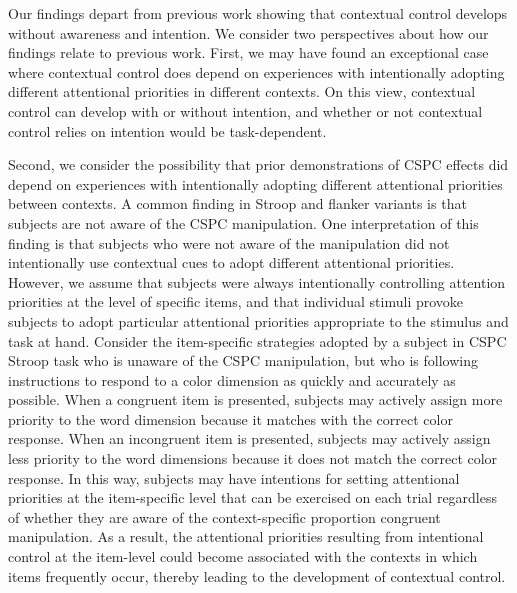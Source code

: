 \documentclass[]{DissertateCUNY}
\begin{document}
Our findings depart from previous work showing that contextual control
develops without awareness and intention. We consider two perspectives
about how our findings relate to previous work. First, we may have found
an exceptional case where contextual control does depend on experiences
with intentionally adopting different attentional priorities in
different contexts. On this view, contextual control can develop with or
without intention, and whether or not contextual control relies on
intention would be task-dependent.

Second, we consider the possibility that prior demonstrations of CSPC
effects did depend on experiences with intentionally adopting different
attentional priorities between contexts. A common finding in Stroop and
flanker variants is that subjects are not aware of the CSPC
manipulation. One interpretation of this finding is that subjects who
were not aware of the manipulation did not intentionally use contextual
cues to adopt different attentional priorities. However, we assume that
subjects were always intentionally controlling attention priorities at
the level of specific items, and that individual stimuli provoke
subjects to adopt particular attentional priorities appropriate to the
stimulus and task at hand. Consider the item-specific strategies adopted
by a subject in CSPC Stroop task who is unaware of the CSPC
manipulation, but who is following instructions to respond to a color
dimension as quickly and accurately as possible. When a congruent item
is presented, subjects may actively assign more priority to the word
dimension because it matches with the correct color response. When an
incongruent item is presented, subjects may actively assign less
priority to the word dimensions because it does not match the correct
color response. In this way, subjects may have intentions for setting
attentional priorities at the item-specific level that can be exercised
on each trial regardless of whether they are aware of the
context-specific proportion congruent manipulation. As a result, the
attentional priorities resulting from intentional control at the
item-level could become associated with the contexts in which items
frequently occur, thereby leading to the development of contextual
control.
\end{document}
